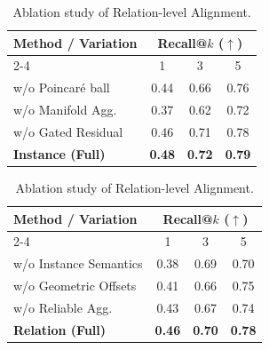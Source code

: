 \documentclass{article}
\begin{document}
\begin{table}[htbp]
    \centering
    \small %
    \renewcommand{\arraystretch}{1.2}
    
    \begin{minipage}{0.49\textwidth}
        \centering
        \caption{Ablation study of Instance-level Alignment.}
        \label{tab:ablation_instance_final}
        \setlength{\tabcolsep}{7.5pt} %
        \begin{tabular}{l|ccc}
            \toprule
            \multirow{2}{*}{Method / Variation} & \multicolumn{3}{c}{Recall@$k$ ($\uparrow$)} \\
            \cmidrule{2-4}
            & 1 & 3 & 5 \\ 
            \midrule
            w/o Poincar\'e ball         & 0.44 & 0.66 & 0.76 \\
            w/o Manifold Agg.           & 0.37 & 0.62 & 0.72 \\ 
            w/o Gated Residual          & 0.46 & 0.71 & 0.78 \\
            \midrule
            \rowcolor[gray]{0.9} \textbf{Instance (Full)} & \textbf{0.48} & \textbf{0.72} & \textbf{0.79} \\
            \bottomrule
        \end{tabular}
    \end{minipage}
    \hfill %
    \begin{minipage}{0.49\textwidth}
        \centering
        \caption{Ablation study of Relation-level Alignment.}
        \label{tab:ablation_relation_refined}
        \setlength{\tabcolsep}{7.5pt}
        \begin{tabular}{l|ccc}
            \toprule
            \multirow{2}{*}{Method / Variation} & \multicolumn{3}{c}{Recall@$k$ ($\uparrow$)} \\
            \cmidrule{2-4}
            & 1 & 3 & 5 \\ 
            \midrule
            w/o  Instance Semantics           & 0.38 & 0.69 & 0.70 \\
            w/o Geometric Offsets            & 0.41 & 0.66 & 0.75 \\
            w/o Reliable Agg.        & 0.43 & 0.67 & 0.74 \\
            \midrule
            \rowcolor[gray]{0.9} \textbf{Relation (Full)} & \textbf{0.46} & \textbf{0.70} & \textbf{0.78} \\
            \bottomrule
        \end{tabular}
    \end{minipage}
\end{table}
\end{document}
